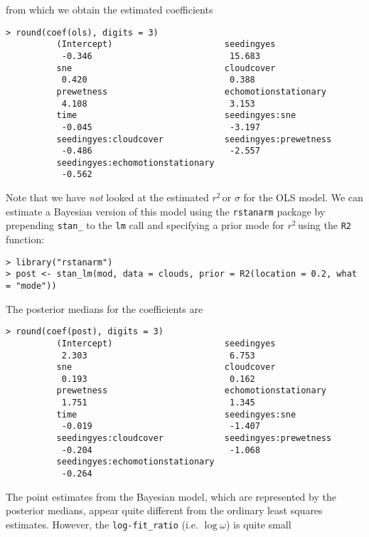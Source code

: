 \documentclass[11pt]{article}
\newcommand{\Rsq}{$r^2\,$}
\begin{document}
from which we obtain the estimated coefficients

\begin{lstlisting}
> round(coef(ols), digits = 3)
          (Intercept)                      seedingyes
           -0.346                           15.683
          sne                              cloudcover
           0.420                            0.388
          prewetness                       echomotionstationary
           4.108                            3.153
          time                             seedingyes:sne
           -0.045                           -3.197
          seedingyes:cloudcover            seedingyes:prewetness
           -0.486                           -2.557
          seedingyes:echomotionstationary
           -0.562
\end{lstlisting}

Note that we have \emph{not} looked at the estimated \Rsq or $\sigma$ for the
OLS model. We can estimate a Bayesian version of this model using the
{\tt rstanarm} package by prepending {\tt stan\_} to the {\tt lm} call and
specifying a prior mode for \Rsq using the {\tt R2} function:

\begin{lstlisting}
> library("rstanarm")
> post <- stan_lm(mod, data = clouds, prior = R2(location = 0.2, what = "mode"))
\end{lstlisting}

The posterior medians for the coefficients are

\begin{lstlisting}
> round(coef(post), digits = 3)
          (Intercept)                      seedingyes
           2.303                            6.753
          sne                              cloudcover
           0.193                            0.162
          prewetness                       echomotionstationary
           1.751                            1.345
          time                             seedingyes:sne
           -0.019                           -1.407
          seedingyes:cloudcover            seedingyes:prewetness
           -0.204                           -1.068
          seedingyes:echomotionstationary
           -0.264
\end{lstlisting}


The point estimates from the Bayesian model, which are represented by the
posterior medians, appear quite different from the ordinary least squares
estimates. However, the {\tt log-fit\_ratio} (i.e. $\log{\omega}$) is
quite small
\end{document}
